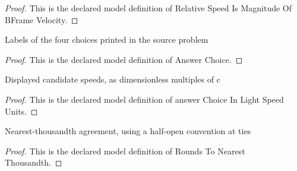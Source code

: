 \begin{proof}
  This is the declared model definition of Relative Speed Is Magnitude Of BFrame Velocity.
\end{proof}
\begin{definition}
  \label{def:physics:phyx-mini-0547:phyxminiproblems-problemphyxmini0547-answerchoice}
  Labels of the four choices printed in the source problem
\end{definition}
\begin{proof}
  This is the declared model definition of Answer Choice.
\end{proof}
\begin{definition}
  \label{def:physics:phyx-mini-0547:phyxminiproblems-problemphyxmini0547-answerchoiceinlightspeedunits}
  Displayed candidate speeds, as dimensionless multiples of c
\end{definition}
\begin{proof}
  This is the declared model definition of answer Choice In Light Speed Units.
\end{proof}
\begin{definition}
  \label{def:physics:phyx-mini-0547:phyxminiproblems-problemphyxmini0547-roundstonearestthousandth}
  Nearest-thousandth agreement, using a half-open convention at ties
\end{definition}
\begin{proof}
  This is the declared model definition of Rounds To Nearest Thousandth.
\end{proof}
